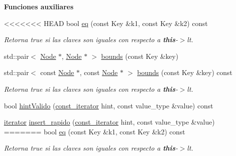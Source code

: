\begin{Indent}\textbf{ Funciones auxiliares}\par
\begin{DoxyCompactItemize}
\item 
<<<<<<< HEAD
bool \hyperlink{classaed2_1_1map_ab45cb28bb215cd229383d88b96b3f624_ab45cb28bb215cd229383d88b96b3f624}{eq} (const \-Key \&k1, const \-Key \&k2) const 
\begin{DoxyCompactList}\small\item\em \-Retorna true si las claves son iguales con respecto a {\bfseries this}-\/$>$lt. \end{DoxyCompactList}\item 
std\-::pair$<$ \hyperlink{structaed2_1_1map_1_1Node}{\-Node} $\ast$, \hyperlink{structaed2_1_1map_1_1Node}{\-Node} $\ast$ $>$ \hyperlink{classaed2_1_1map_aa079b9390f988f97be26fd51ed44a2c9_aa079b9390f988f97be26fd51ed44a2c9}{bounds} (const \-Key \&key)
\item 
std\-::pair$<$ const \hyperlink{structaed2_1_1map_1_1Node}{\-Node} $\ast$, const \*
\hyperlink{structaed2_1_1map_1_1Node}{\-Node} $\ast$ $>$ \hyperlink{classaed2_1_1map_a4d903414b3f1f1e6f785342bb3900572_a4d903414b3f1f1e6f785342bb3900572}{bounds} (const \-Key \&key) const 
\begin{DoxyCompactList}\small\item\em \-Retorna true si las claves son iguales con respecto a {\bfseries this}-\/$>$lt. \end{DoxyCompactList}\item 
bool \hyperlink{classaed2_1_1map_a45b04533e9acf27438813ab4a2604443_a45b04533e9acf27438813ab4a2604443}{hint\-Valido} (\hyperlink{classaed2_1_1map_1_1const__iterator}{const\-\_\-iterator} hint, const value\-\_\-type \&value) const 
\item 
\hyperlink{classaed2_1_1map_1_1iterator}{iterator} \hyperlink{classaed2_1_1map_a4b4f1e65ee9aeccee4046d53fd5fd8a4_a4b4f1e65ee9aeccee4046d53fd5fd8a4}{insert\-\_\-rapido} (\hyperlink{classaed2_1_1map_1_1const__iterator}{const\-\_\-iterator} hint, const value\-\_\-type \&value)
=======
bool \hyperlink{classaed2_1_1map_aebf6c09c424c39a874798165401b309e_aebf6c09c424c39a874798165401b309e}{eq} (const Key \&k1, const Key \&k2) const
\begin{DoxyCompactList}\small\item\em Retorna true si las claves son iguales con respecto a {\bfseries this}-\/$>$lt. \end{DoxyCompactList}\item 

\end{DoxyCompactItemize}
\end{Indent}
